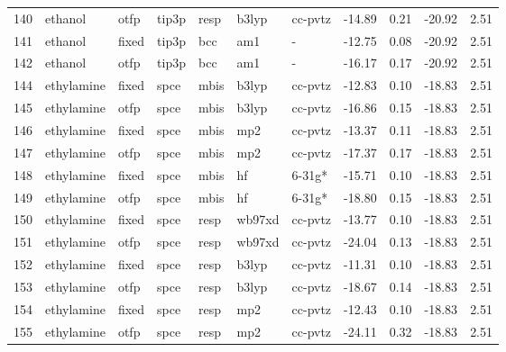 \begin{tabular}{lllllllrrrr}
140 &                       ethanol &   otfp &  tip3p &   resp &   b3lyp &      cc-pvtz &      -14.89 &     0.21 &      -20.92 &      2.51 \\
141 &                       ethanol &  fixed &  tip3p &    bcc &     am1 &            - &      -12.75 &     0.08 &      -20.92 &      2.51 \\
142 &                       ethanol &   otfp &  tip3p &    bcc &     am1 &            - &      -16.17 &     0.17 &      -20.92 &      2.51 \\
144 &                    ethylamine &  fixed &   spce &   mbis &   b3lyp &      cc-pvtz &      -12.83 &     0.10 &      -18.83 &      2.51 \\
145 &                    ethylamine &   otfp &   spce &   mbis &   b3lyp &      cc-pvtz &      -16.86 &     0.15 &      -18.83 &      2.51 \\
146 &                    ethylamine &  fixed &   spce &   mbis &     mp2 &      cc-pvtz &      -13.37 &     0.11 &      -18.83 &      2.51 \\
147 &                    ethylamine &   otfp &   spce &   mbis &     mp2 &      cc-pvtz &      -17.37 &     0.17 &      -18.83 &      2.51 \\
148 &                    ethylamine &  fixed &   spce &   mbis &      hf &       6-31g* &      -15.71 &     0.10 &      -18.83 &      2.51 \\
149 &                    ethylamine &   otfp &   spce &   mbis &      hf &       6-31g* &      -18.80 &     0.15 &      -18.83 &      2.51 \\
150 &                    ethylamine &  fixed &   spce &   resp &  wb97xd &      cc-pvtz &      -13.77 &     0.10 &      -18.83 &      2.51 \\
151 &                    ethylamine &   otfp &   spce &   resp &  wb97xd &      cc-pvtz &      -24.04 &     0.13 &      -18.83 &      2.51 \\
152 &                    ethylamine &  fixed &   spce &   resp &   b3lyp &      cc-pvtz &      -11.31 &     0.10 &      -18.83 &      2.51 \\
153 &                    ethylamine &   otfp &   spce &   resp &   b3lyp &      cc-pvtz &      -18.67 &     0.14 &      -18.83 &      2.51 \\
154 &                    ethylamine &  fixed &   spce &   resp &     mp2 &      cc-pvtz &      -12.43 &     0.10 &      -18.83 &      2.51 \\
155 &                    ethylamine &   otfp &   spce &   resp &     mp2 &      cc-pvtz &      -24.11 &     0.32 &      -18.83 &      2.51 \\

\end{tabular}
